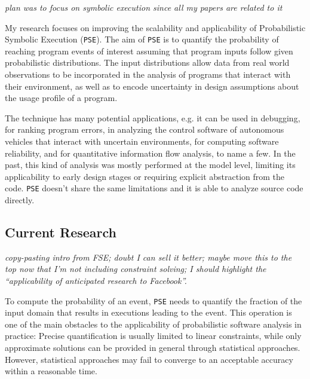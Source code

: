 \documentclass[12pt]{article}
\newcounter{list}
\begin{document}
\newcommand{\PSE}{\texttt{PSE}}
\newcommand{\qCORAL}{\texttt{qCORAL}}
\raisebox{1cm}

\textit{plan was to focus on symbolic execution since all my papers are related to it}

My research focuses on improving the scalability and applicability of
Probabilistic Symbolic Execution (\PSE{}). The aim of \PSE{}
\cite{borges2015iterative} is to quantify the probability of reaching
program events of interest assuming that program inputs follow given
probabilistic distributions. The input distributions allow data from
real world observations to be incorporated in the analysis of programs
that interact with their environment, as well as to encode uncertainty
in design assumptions about the usage profile of a program.

The technique has many potential applications, e.g. it can be used in
debugging, for ranking program errors, in analyzing the control
software of autonomous vehicles that interact with uncertain
environments, for computing software reliability, and for quantitative
information flow analysis, to name a few. In the past, this kind of
analysis was mostly performed at the model level, limiting its
applicability to early design stages or requiring explicit abstraction
from the code. \PSE{} doesn't share the same limitations and it is able
to analyze source code directly.

\subsection*{Current Research}

\textit{copy-pasting intro from FSE; doubt I can sell it better; maybe
  move this to the top now that I'm not including constraint solving;
  I should highlight the ``applicability of anticipated research to
  Facebook''.}


To compute the probability of an event, \PSE{} needs to quantify the
fraction of the input domain that results in executions leading to the
event. This operation is one of the main obstacles to the
applicability of probabilistic software analysis in practice: Precise
quantification is usually limited to linear constraints, while only
approximate solutions can be provided in general through statistical
approaches. However, statistical approaches may fail to converge to an
acceptable accuracy within a reasonable time.
\end{document}
